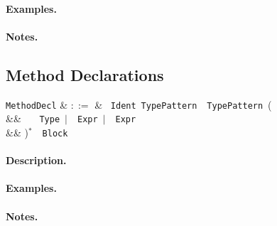 \paragraph{Examples.}

\paragraph{Notes.}


\subsection{Method Declarations}

\begin{syntax}
  \verb+MethodDecl+ & $::=$ & \ \verb+Ident+\
  \verb+TypePattern+\ \token{=>}\ \verb+TypePattern+\ \big(\\
  && \ \ \ \verb+Type+\ $|$\ \
  \verb+Expr+\ $|$\ \ \verb+Expr+\\
  && \big)$^*$\ \token{:}\ \verb+Block+\\
\end{syntax}

\paragraph{Description.}

\paragraph{Examples.}

\paragraph{Notes.}




